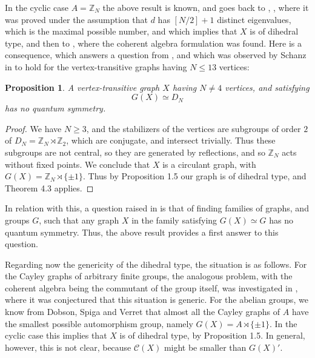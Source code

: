\documentclass[11pt]{amsart}
\newtheorem{proposition}[theorem]{Proposition}
\newcommand{\C}{\mathcal C}
\newcommand{\Z}{\mathbb Z}
\begin{document}
In the cyclic case $A=\Z_N$ the above result is known, and goes back to \cite{ba2}, \cite{bb}, where it was proved under the assumption that $d$ has $[N/2]+1$ distinct eigenvalues, which is the maximal possible number, and which implies that $X$ is of dihedral type, and then to \cite{lmr}, where the coherent algebra formulation was found. Here is a consequence, which answers a question from \cite{bb}, and which was observed by Schanz in \cite{scz} to hold for the vertex-transitive graphs having $N\leq13$ vertices:

\begin{proposition}
A vertex-transitive graph $X$ having $N\neq4$ vertices, and satisfying
$$G(X)\simeq D_N$$
has no quantum symmetry.
\end{proposition}

\begin{proof}
We have $N\geq3$, and the stabilizers of the vertices are subgroups of order $2$ of $D_N=\Z_N\rtimes\Z_2$, which are conjugate, and intersect trivially. Thus these subgroups are not central, so they are generated by reflections, and so $\Z_N$ acts without fixed points. We conclude that $X$ is a circulant graph, with $G(X)=\Z_N\rtimes\{\pm1\}$. Thus by Proposition 1.5 our graph is of dihedral type, and Theorem 4.3 applies.
\end{proof}

In relation with this, a question raised in \cite{scz} is that of finding families of graphs, and groups $G$, such that any graph $X$ in the family satisfying $G(X)\simeq G$ has no quantum symmetry. Thus, the above result provides a first answer to this question.

Regarding now the genericity of the dihedral type, the situation is as follows. For the Cayley graphs of arbitrary finite groups, the analogous problem, with the coherent algebra being the commutant of the group itself, was investigated in \cite{mn}, where it was conjectured that this situation is generic. For the abelian groups, we know from Dobson, Spiga and Verret \cite{dsv} that almost all the Cayley graphs of $A$ have the smallest possible automorphism group, namely $G(X)=A\rtimes\{\pm1\}$. In the cyclic case this implies that $X$ is of dihedral type, by Proposition 1.5. In general, however, this is not clear, because $\C(X)$ might be smaller than $G(X)'$.
\end{document}
